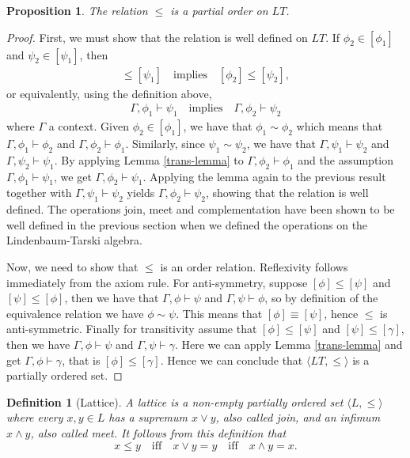 \documentclass[titlepage]{article}
\newtheorem{definition}{Definition}[section]
\newtheorem{proposition}{Proposition}
\begin{document}
\begin{proposition}
    The relation $\leq$ is a partial order on $LT$.
\end{proposition}

\begin{proof}
    First, we must show that the relation is well defined on $LT$. If $\phi_2 \in [\phi_1]$ and $\psi_2 \in [\psi_1]$, then 
    \begin{align*}
        [\phi_1] \leq [\psi_1] \quad \text{implies} \quad [\phi_2] \leq [\psi_2],
    \end{align*}
    or equivalently, using the definition above,
    \begin{align*}
        \Gamma, \phi_1 \vdash \psi_1 \quad \text{implies} \quad \Gamma, \phi_2 \vdash \psi_2
    \end{align*}
    where $\Gamma$ a context. Given $\phi_2 \in [\phi_1]$, we have that $\phi_1 \sim \phi_2$ which means that $\Gamma, \phi_1 \vdash \phi_2$ and $\Gamma, \phi_2 \vdash \phi_1$. Similarly, since $\psi_1 \sim \psi_2$, we have that $\Gamma, \psi_1 \vdash \psi_2$ and $\Gamma, \psi_2 \vdash \psi_1$. By applying Lemma \ref{trans-lemma} to $\Gamma, \phi_2 \vdash \phi_1$ and the assumption $\Gamma, \phi_1 \vdash \psi_1$, we get $\Gamma, \phi_2 \vdash \psi_1$. Applying the lemma again to the previous result together with $\Gamma, \psi_1 \vdash \psi_2$ yields $\Gamma, \phi_2 \vdash \psi_2$, showing that the relation is well defined. The operations join, meet and complementation have been shown to be well defined in the previous section when we defined the operations on the Lindenbaum-Tarski algebra.

    Now, we need to show that $\leq$ is an order relation. Reflexivity follows immediately from the axiom rule. For anti-symmetry, suppose $[\phi] \leq [\psi]$ and $[\psi] \leq [\phi]$, then we have that $\Gamma, \phi \vdash \psi$ and $\Gamma, \psi \vdash \phi$, so by definition of the equivalence relation we have $\phi \sim \psi$. This means that $[\phi] \equiv [\psi]$, hence $\leq$ is anti-symmetric. Finally for transitivity assume that $[\phi] \leq [\psi]$ and $[\psi] \leq [\gamma]$, then we have $\Gamma, \phi \vdash \psi$ and $\Gamma, \psi \vdash \gamma$. Here we can apply Lemma \ref{trans-lemma} and get $\Gamma, \phi \vdash \gamma$, that is $[\phi] \leq [\gamma]$. Hence we can conclude that $\langle LT, \leq \rangle$ is a partially ordered set.
\end{proof}


\begin{definition}[Lattice]\label{lattice}
    A lattice is a non-empty partially ordered set $\langle L, \leq \rangle$ where every $x,y \in L$ has a supremum $x\vee y$, also called join, and an infimum $x \wedge y$, also called meet. It follows from this definition that
    $$x \leq y \quad \text{iff} \quad x \vee y = y \quad \text{iff} \quad x \wedge y = x.$$
\end{definition}
\end{document}
